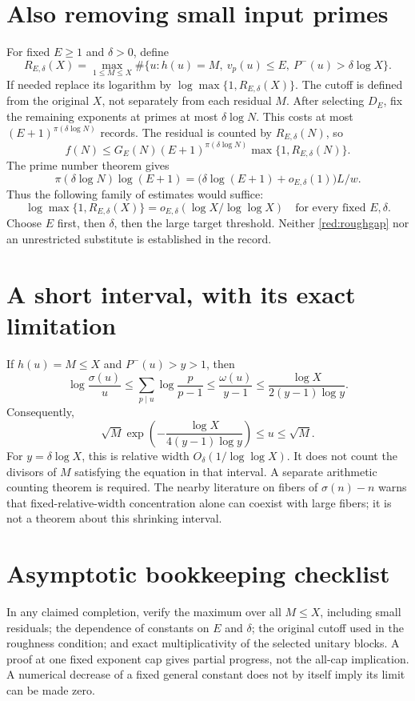 \section{Also removing small input primes}
For fixed $E\ge1$ and $\delta>0$, define
\[
 R_{E,\delta}(X)=\max_{1\le M\le X}
 \#\{u:h(u)=M,\ v_p(u)\le E,\ P^-(u)>\delta\log X\}.
\]
If needed replace its logarithm by $\log\max\{1,R_{E,\delta}(X)\}$.
The cutoff is defined from the original $X$, not separately from each residual
$M$. After selecting $D_E$, fix the remaining exponents at primes at most
$\delta\log N$. This costs at most $(E+1)^{\pi(\delta\log N)}$ records.
The residual is counted by $R_{E,\delta}(N)$, so
\begin{equation}\label{red:rough}
 \boxed{f(N)\le G_E(N)(E+1)^{\pi(\delta\log N)}
 \max\{1,R_{E,\delta}(N)\}.}
\end{equation}
The prime number theorem gives
\[
 \pi(\delta\log N)\log(E+1)
 =\bigl(\delta\log(E+1)+o_{E,\delta}(1)\bigr)L/w.
\]
Thus the following family of estimates would suffice:
\begin{equation}\label{red:roughgap}
 \boxed{\log\max\{1,R_{E,\delta}(X)\}
 =o_{E,\delta}(\log X/\log\log X)
 \quad\text{for every fixed }E,\delta.}
\end{equation}
Choose $E$ first, then $\delta$, then the large target threshold. Neither
\eqref{red:roughgap} nor an unrestricted substitute is established in the record.

\section{A short interval, with its exact limitation}
If $h(u)=M\le X$ and $P^-(u)>y>1$, then
\[
 \log\frac{\sigma(u)}u
 \le\sum_{p\mid u}\log\frac p{p-1}
 \le\frac{\omega(u)}{y-1}
 \le\frac{\log X}{2(y-1)\log y}.
\]
Consequently,
\begin{equation}\label{red:interval}
 \sqrt M\exp\!\left(-\frac{\log X}{4(y-1)\log y}\right)
 \le u\le\sqrt M.
\end{equation}
For $y=\delta\log X$, this is relative width $O_\delta(1/\log\log X)$.
It does not count the divisors of $M$ satisfying the equation in that interval.
A separate arithmetic counting theorem is required. The nearby literature on
fibers of $\sigma(n)-n$ warns that fixed-relative-width concentration alone can
coexist with large fibers; it is not a theorem about this shrinking interval.

\section{Asymptotic bookkeeping checklist}
In any claimed completion, verify the maximum over all $M\le X$, including small
residuals; the dependence of constants on $E$ and $\delta$; the original cutoff
used in the roughness condition; and exact multiplicativity of the selected
unitary blocks. A proof at one fixed exponent cap gives partial progress, not
the all-cap implication. A numerical decrease of a fixed general constant does
not by itself imply its limit can be made zero.

